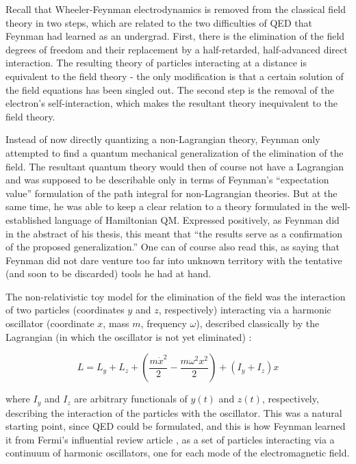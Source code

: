 \documentclass[12pt,a4paper]{article}
\begin{document}
Recall that Wheeler-Feynman electrodynamics is removed from the classical field theory in two steps, which are related to the two difficulties of QED that Feynman had learned as an undergrad. First, there is the elimination of the field degrees of freedom and their replacement by a half-retarded, half-advanced direct interaction. The resulting theory of particles interacting at a distance is equivalent to the field theory - the only modification is that a certain solution of the field equations has been singled out. The second step is the removal of the electron's self-interaction, which makes the resultant theory inequivalent to the field theory.

Instead of now directly quantizing a non-Lagrangian theory, Feynman only attempted to find a quantum mechanical generalization of the elimination of the field. The resultant quantum theory would then of course not have a Lagrangian and was supposed to be describable only in terms of Feynman's ``expectation value'' formulation of the path integral for non-Lagrangian theories. But at the same time, he was able to keep a clear relation to a theory formulated in the well-established language of Hamiltonian QM. Expressed positively, as Feynman did in the abstract of his thesis, this meant that ``the results serve as a confirmation of the proposed generalization.'' One can of course also read this, as saying that Feynman did not dare venture too far into unknown territory with the tentative (and soon to be discarded) tools he had at hand.

The non-relativistic toy model for the elimination of the field was the interaction of two particles (coordinates $y$ and $z$, respectively) interacting via a harmonic oscillator (coordinate $x$, mass $m$, frequency $\omega$), described classically by the Lagrangian (in which the oscillator is not yet eliminated) :

\begin{equation}
L = L_y + L_z + \left(\frac{m \dot{x}^2}{2} - \frac{m \omega^2 x^2}{2} \right) + (I_y + I_z) x
\end{equation}

where $I_y$ and $I_z$ are arbitrary functionals of $y(t)$ and $z(t)$, respectively, describing the interaction of the particles with the oscillator. This was a natural starting point, since QED could be formulated, and this is how Feynman learned it from Fermi's influential review article \citep{fermi_1932_quantum}, as a set of particles interacting via a continuum of harmonic oscillators, one for each mode of the electromagnetic field.
\end{document}

